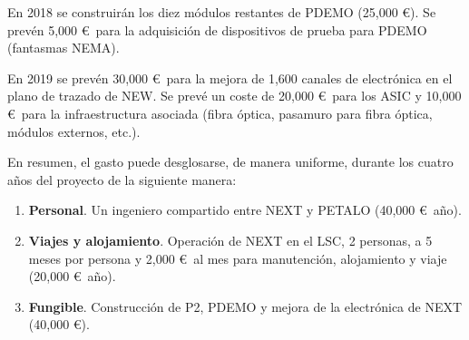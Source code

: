 En 2018 se construirán los diez módulos restantes de PDEMO (25,000 \euro). Se prevén 5,000 \euro\ para la adquisición de dispositivos de prueba para PDEMO (fantasmas NEMA). 

En 2019 se prevén 30,000 \euro\ para la mejora de 1,600 canales de electrónica en el plano de trazado de NEW. Se prevé un coste de 20,000 \euro\ para los ASIC y 10,000 \euro\ para la infraestructura asociada (fibra óptica, pasamuro para fibra óptica, módulos externos, etc.).

En resumen, el gasto puede desglosarse, de manera uniforme, durante los cuatro años del proyecto de la siguiente manera:
\begin{enumerate}
\item {\bf Personal}. Un ingeniero compartido entre NEXT y PETALO (40,000 \euro\ año).
\item {\bf Viajes y alojamiento}. Operación de NEXT en el LSC, 2 personas, a 5 meses por persona y 2,000 \euro\ al mes para manutención, alojamiento y viaje (20,000 \euro\ año).
\item {\bf Fungible}. Construcción de P2, PDEMO y mejora de la electrónica de NEXT (40,000 \euro).

\end{enumerate}
